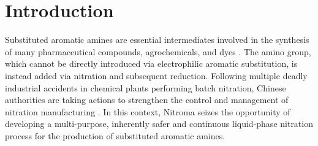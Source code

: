 \section{Introduction}
\label{sec:introduction}

Substituted aromatic amines are essential intermediates involved in the synthesis of many pharmaceutical compounds, agrochemicals, and dyes \cite{vogt_amines_2000}. The amino group, which cannot be directly introduced via electrophilic aromatic substitution, is instead added via nitration and subsequent reduction.
Following multiple deadly industrial accidents in chemical plants performing batch nitration, Chinese authorities are taking actions to strengthen the control and management of nitration manufacturing \cite{noauthor_china_2019}.
In this context, Nitroma seizes the opportunity of developing a multi-purpose, inherently safer and continuous liquid-phase nitration process for the production of substituted aromatic  amines. 

\begin{comment}
Substituted aromatic amines are essential intermediates involved in the synthesis of many pharmaceutical compounds, agrochemicals, and dyes \cite{vogt_amines_2000}. The easy replacement of the amino group by other functional groups makes them very attractive versatile intermediates. The amino group, which cannot be directly introduced via electrophilic aromatic substitution, is instead added via the nitration of the aromatic ring, followed by reduction.

Following multiple deadly industrial accidents in chemical plants performing batch nitration, especially the 2019 Xiangshui chemical plant explosion, Chinese authorities are taking actions to strengthen the control and management of nitration manufacturing. Inspections and in-depth risk assessments are expected to be conducted to ensure compliance of the plants with the regulations on dangerous chemicals \cite{noauthor_china_2019}.

In this context, Nitroma seizes the opportunity of developing a multi-purpose and continuous liquid phase nitration process for the conversion of substituted aromatics to their respective nitrates and subsequently to their amines. 
\end{comment}